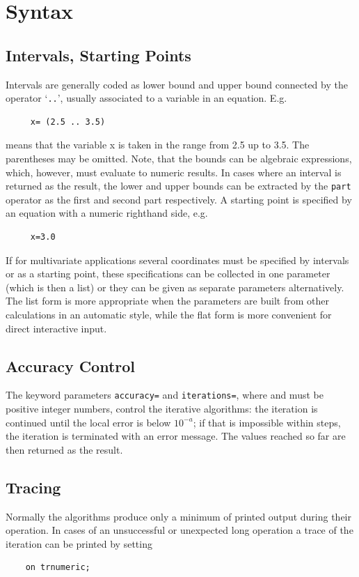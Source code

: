 \section{Syntax}

\subsection{Intervals, Starting Points}

Intervals are generally coded as lower bound and
upper bound connected by the operator `\texttt{..}', usually
associated to a variable in an
equation. E.g.
\begin{verbatim}
     x= (2.5 .. 3.5)
\end{verbatim}
means that the variable x is taken in the range from 2.5 up to
3.5.  The parentheses may be omitted.
Note, that the bounds can be algebraic
expressions, which, however, must evaluate to numeric results.
In cases where an interval is returned as the result, the lower
and upper bounds can be extracted by the \texttt{part} operator
as the first and second part respectively.
A starting point is specified by an equation with a numeric
righthand side, e.g.
\begin{verbatim}
     x=3.0
\end{verbatim}
If for multivariate applications several coordinates must be
specified by intervals or as a starting point, these
specifications can be collected in one parameter (which is then
a list) or they can be given as separate parameters
alternatively. The list form is more appropriate when the
parameters are built from other \REDUCE{} calculations in an
automatic style, while the flat form is more convenient
for direct interactive input.

\subsection{Accuracy Control}

The keyword parameters \texttt{accuracy=} and \texttt{iterations=}, where
 and  must be positive integer numbers, control the
iterative algorithms: the iteration is continued until
the local error is below $10^{-a}$; if that is impossible
within  steps, the iteration is terminated with an
error message. The values reached so far are then returned
as the result.

\subsection{Tracing}
Normally the algorithms produce only a minimum of printed
output during their operation. In cases of an unsuccessful
or unexpected long operation a trace of the iteration can be
printed by setting
\begin{verbatim}
    on trnumeric;
\end{verbatim}


